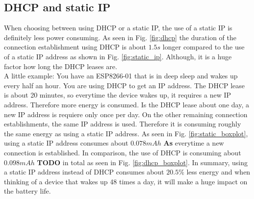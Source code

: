 \subsection{DHCP and static IP}
When choosing between using DHCP or a static IP, the use of a static IP is definitely less power consuming. 
As seen in Fig. \ref{fig:dhcp} the duration of the connection establishment using DHCP is about $1.5 s$ longer compared to the use of a static IP address as shown in Fig. \ref{fig:static_ip}.
Although, it is a huge factor how long the DHCP leases are.\\
A little example: You have an ESP8266-01 that is in deep sleep and wakes up every half an hour. You are using DHCP to get an IP address. 
The DHCP lease is about 20 minutes, so everytime the device wakes up, it requires a new IP address. Therefore more energy is consumed.
Is the DHCP lease about one day, a new IP address is requiere only once per day. On the other remaining connection establishments, the same IP address is used. Therefore it is consuming roughly the same energy as using a static IP address.
As seen in Fig. \ref{fig:static_boxplot}, using a static IP address consumes about $0.078 mAh$ \textbf{As} everytime a new connection is established.
In comparison, the use of DHCP is consuming about $0.098 mAh$ \textbf{TODO} in total as seen in Fig. \ref{fig:dhcp_boxplot}.
In summary, using a static IP address instead of DHCP consumes about $20.5\%$ less energy and when thinking of a device that wakes up 48 times a day, it will make a huge impact on the battery life.